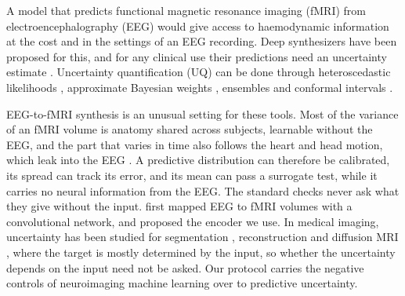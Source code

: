 A model that predicts functional magnetic resonance imaging (fMRI) from electroencephalography (EEG) would give access to haemodynamic information at the cost and in the settings of an EEG recording. Deep synthesizers \citep{liu2019convolutional,calhas2022eeg,li2024neurobolt} have been proposed for this, and for any clinical use their predictions need an uncertainty estimate \citep{begoli2019need}. Uncertainty quantification (UQ) can be done through heteroscedastic likelihoods \citep{kendall2017uncertainties}, approximate Bayesian weights \citep{blundell2015weight,gal2016dropout,maddox2019simple,daxberger2021laplace}, ensembles \citep{lakshminarayanan2017simple} and conformal intervals \citep{lei2018distribution,romano2019conformalized}. 

EEG-to-fMRI synthesis is an unusual setting for these tools. Most of the variance of an fMRI volume is anatomy shared across subjects, learnable without the EEG, and the part that varies in time also follows the heart and head motion, which leak into the EEG \citep{friston1996movement,power2014methods}. A predictive distribution can therefore be calibrated, its spread can track its error, and its mean can pass a surrogate test, while it carries no neural information from the EEG. The standard checks never ask what they give without the input. \citet{liu2019convolutional} first mapped EEG to fMRI volumes with a convolutional network, and \citet{calhas2022eeg} proposed the encoder we use. In medical imaging, uncertainty has been studied for segmentation \citep{mehrtash2020confidence}, reconstruction \citep{narnhofer2021bayesian} and diffusion MRI \citep{tanno2021uncertainty}, where the target is mostly determined by the input, so whether the uncertainty depends on the input need not be asked. Our protocol carries the negative controls of neuroimaging machine learning \citep{varoquaux2018cross,kapoor2023leakage,schreiber1996improved} over to predictive uncertainty.



